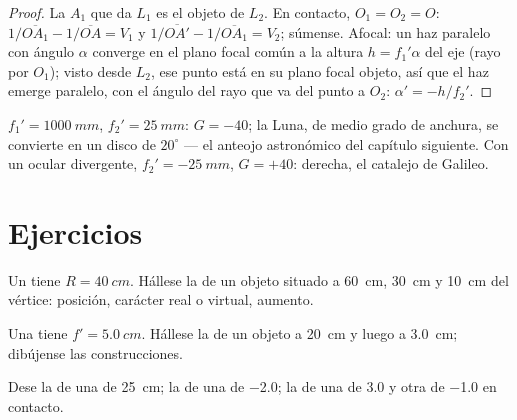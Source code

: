 \begin{proof}
La  $A_1$ que da $L_1$ es el objeto de $L_2$. En contacto,
$O_1 = O_2 = O$: $1/\overline{OA_1} - 1/\overline{OA} = V_1$ y
$1/\overline{OA'} - 1/\overline{OA_1} = V_2$; súmense. Afocal: un haz
paralelo con ángulo $\alpha$ converge en el plano focal común a la altura
$h = f_1'\alpha$ del eje (rayo por $O_1$); visto desde $L_2$, ese punto
está en su plano focal objeto, así que el haz emerge paralelo, con el
ángulo del rayo que va del punto a $O_2$: $\alpha' = -h/f_2'$.
\end{proof}

\begin{example}\label{ex:b1:mirrors-thin-lenses:afocal}
$f_1' = \qty{1000}{mm}$, $f_2' = \qty{25}{mm}$: $G = -40$; la Luna, de
medio grado de anchura, se convierte en un disco de $20^\circ$ --- el
anteojo astronómico del capítulo siguiente. Con un ocular divergente,
$f_2' = \qty{-25}{mm}$, $G = +40$: derecha, el catalejo de Galileo.
\end{example}

\section{Ejercicios}

\begin{exercise}[$\star$]\label{exo:b1:mirrors-thin-lenses:1}
Un  tiene $R = \qty{40}{cm}$. Hállese la  de un objeto
situado a \qty{60}{cm}, \qty{30}{cm} y \qty{10}{cm} del vértice: posición,
carácter real o virtual, aumento.
\end{exercise}

\begin{exercise}[$\star$]\label{exo:b1:mirrors-thin-lenses:2}
Una  tiene $f' = \qty{5.0}{cm}$. Hállese la  de un
objeto a \qty{20}{cm} y luego a \qty{3.0}{cm}; dibújense las construcciones.
\end{exercise}

\begin{exercise}[$\star$]\label{exo:b1:mirrors-thin-lenses:3}
Dese la  de una  de  \qty{25}{cm}; la
 de una  de \qty{-2.0}{\delta}; la  de
una  de \qty{+3.0}{\delta} y otra de \qty{-1.0}{\delta} en contacto.
\end{exercise}

